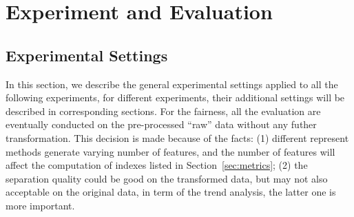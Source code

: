 \chapter{Experiment and Evaluation}

\section{Experimental Settings}
In this section, we describe the general experimental settings applied to all the following experiments, for different experiments, their additional settings will be described in corresponding sections. For the fairness, all the evaluation are eventually conducted on the pre-processed ``raw'' data without any futher transformation. This decision is made because of the facts: (1)
different represent methods generate varying number of features, and the number of features will affect the computation of indexes listed in Section~\ref{sec:metrics}; (2) the separation quality could be good on the transformed data, but may not also acceptable on the original data, in term of the trend analysis, the latter one is more important. 

